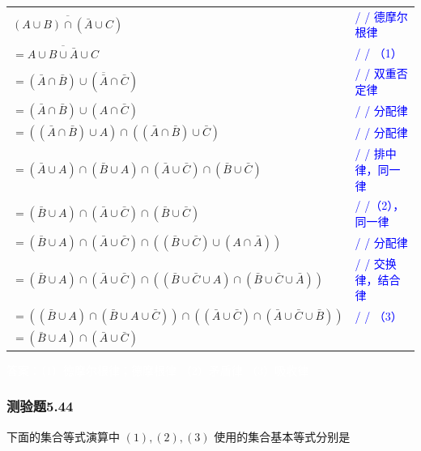 \documentclass[UTF8, heading=true]{ctexart}
\begin{document}
\clearpage

\begin{table}[H]
  \centering
  \renewcommand{\arraystretch}{1.5}
  \begin{tabular}{ll}
    $\overline{(A \cup B) \cap (\bar{A} \cup C)}$ & \textcolor{blue}{/ / 德摩尔根律} \\
    $=\overline{A \cup B \cup \bar{A} \cup C}$ & \textcolor{blue}{/ / （1）} \\
    $=(\bar{A} \cap \bar{B}) \cup (\overline{\bar{A}} \cap \bar{C})$ & \textcolor{blue}{/ / 双重否定律} \\
    $=(\bar{A} \cap \bar{B}) \cup (A \cap \bar{C})$ & \textcolor{blue}{/ / 分配律} \\
    $=((\bar{A} \cap \bar{B}) \cup A) \cap ((\bar{A} \cap \bar{B}) \cup \bar{C})$ & \textcolor{blue}{/ / 分配律} \\
    $=(\bar{A} \cup A) \cap (\bar{B} \cup A) \cap (\bar{A} \cup \bar{C}) \cap (\bar{B} \cup \bar{C})$ & \textcolor{blue}{/ / 排中律，同一律} \\
    $=(\bar{B} \cup A) \cap (\bar{A} \cup \bar{C}) \cap (\bar{B} \cup \bar{C})$ & \textcolor{blue}{/ /（2），同一律} \\
    $=(\bar{B} \cup A) \cap (\bar{A} \cup \bar{C}) \cap ((\bar{B} \cup \bar{C}) \cup (A \cap \bar{A}))$ & \textcolor{blue}{/ / 分配律} \\
    $=(\bar{B} \cup A) \cap (\bar{A} \cup \bar{C}) \cap ((\bar{B} \cup \bar{C} \cup A) \cap (\bar{B} \cup \bar{C} \cup \bar{A}))$ & \textcolor{blue}{/ / 交换律，结合律} \\
    $=((\bar{B} \cup A) \cap (\bar{B} \cup A \cup \bar{C})) \cap ((\bar{A} \cup \bar{C}) \cap (\bar{A} \cup \bar{C} \cup \bar{B}))$ & \textcolor{blue}{/ / （3）} \\
    $=(\bar{B} \cup A) \cap (\bar{A} \cup \bar{C})$ & \\
  \end{tabular}
\end{table}

\textcolor{white}
{
  答案：（1）徳摩尔根律；德摩根律
  （2）矛盾律
  （3）吸收律
}

\subsubsection{测验题5.44}

下面的集合等式演算中 $(1),(2),(3)$ 使用的集合基本等式分别是
\end{document}
